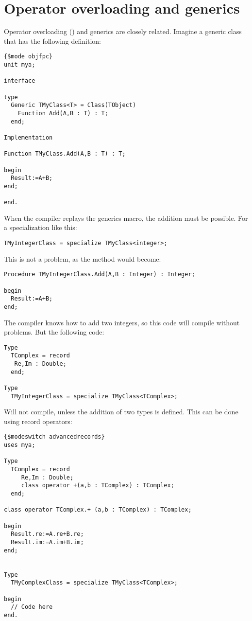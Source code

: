 \section{Operator overloading and generics}
Operator overloading () and  generics are closely related.
Imagine a generic class that has the following definition:
\begin{verbatim}
{$mode objfpc}
unit mya;

interface

type
  Generic TMyClass<T> = Class(TObject)
    Function Add(A,B : T) : T;
  end;

Implementation

Function TMyClass.Add(A,B : T) : T;

begin
  Result:=A+B;
end;

end.
\end{verbatim}
When the compiler replays the generics macro, the addition must be possible.
For a specialization like this:
\begin{verbatim}
TMyIntegerClass = specialize TMyClass<integer>;
\end{verbatim}
This is not a problem, as the  method would become:
\begin{verbatim}
Procedure TMyIntegerClass.Add(A,B : Integer) : Integer;

begin
  Result:=A+B;
end;
\end{verbatim}
The compiler knows how to add two integers, so this code will compile without
problems. But the following code:
\begin{verbatim}
Type
  TComplex = record
   Re,Im : Double;
  end;

Type
  TMyIntegerClass = specialize TMyClass<TComplex>;
\end{verbatim}
Will not compile, unless the addition of two  types is defined.
This can be done using record operators:
\begin{verbatim}
{$modeswitch advancedrecords}
uses mya;

Type
  TComplex = record
     Re,Im : Double;
     class operator +(a,b : TComplex) : TComplex;
  end;

class operator TComplex.+ (a,b : TComplex) : TComplex;

begin
  Result.re:=A.re+B.re;
  Result.im:=A.im+B.im;
end;


Type
  TMyComplexClass = specialize TMyClass<TComplex>;

begin
  // Code here
end.
\end{verbatim}
